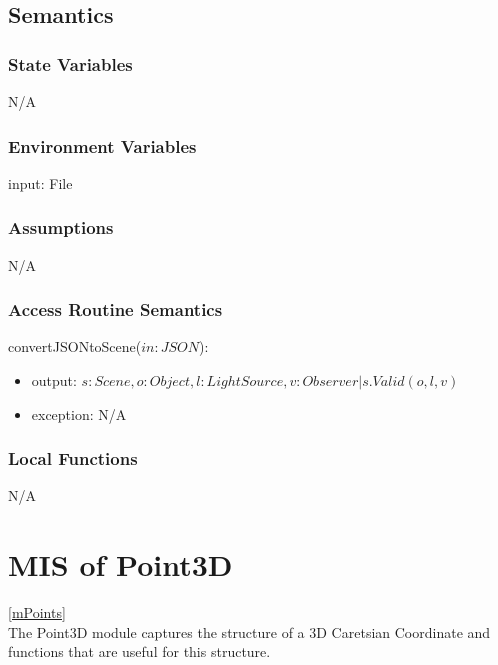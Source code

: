 \documentclass[12pt, titlepage]{article}
\begin{document}
\subsection{Semantics}
\subsubsection{State Variables}
N/A

\subsubsection{Environment Variables}
input: File

\subsubsection{Assumptions}
N/A

\subsubsection{Access Routine Semantics}
\noindent convertJSONtoScene($in: JSON$):
\begin{itemize}
	\item output: $s : Scene, o : Object, l : LightSource , v: Observer | 
	s.Valid(o,l,v)$ %
	\item exception: N/A
\end{itemize}

\subsubsection{Local Functions}
N/A

\newpage


\section{MIS of Point3D} \ref{mPoints} \\
The Point3D module captures the structure of a 3D Caretsian Coordinate and 
functions that are useful for this structure.
\end{document}
